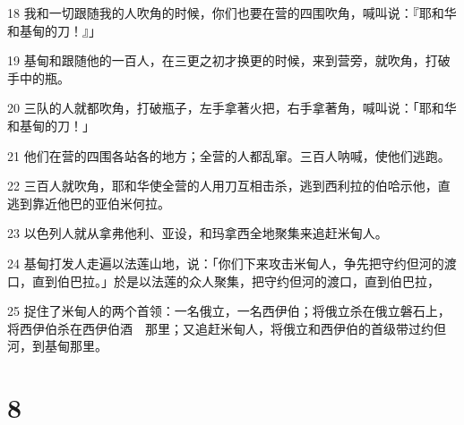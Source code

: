 \par 18 我和一切跟随我的人吹角的时候，你们也要在营的四围吹角，喊叫说：『耶和华和基甸的刀！』」
\par 19 基甸和跟随他的一百人，在三更之初才换更的时候，来到营旁，就吹角，打破手中的瓶。
\par 20 三队的人就都吹角，打破瓶子，左手拿著火把，右手拿著角，喊叫说：「耶和华和基甸的刀！」
\par 21 他们在营的四围各站各的地方；全营的人都乱窜。三百人呐喊，使他们逃跑。
\par 22 三百人就吹角，耶和华使全营的人用刀互相击杀，逃到西利拉的伯哈示他，直逃到靠近他巴的亚伯米何拉。
\par 23 以色列人就从拿弗他利、亚设，和玛拿西全地聚集来追赶米甸人。
\par 24 基甸打发人走遍以法莲山地，说：「你们下来攻击米甸人，争先把守约但河的渡口，直到伯巴拉。」於是以法莲的众人聚集，把守约但河的渡口，直到伯巴拉，
\par 25 捉住了米甸人的两个首领：一名俄立，一名西伊伯；将俄立杀在俄立磐石上，将西伊伯杀在西伊伯酒　那里；又追赶米甸人，将俄立和西伊伯的首级带过约但河，到基甸那里。

\chapter{8}

